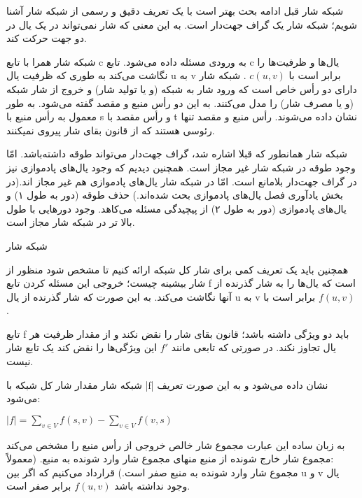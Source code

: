 
\begin{itemframe}{شبکه شار}
\itm
قبل ادامه بحث بهتر است با یک تعریف دقیق و رسمی از شبکه شار آشنا شویم؛
\itm
شبکه شار یک گراف جهت‌دار است. به این معنی که شار نمی‌تواند در یک یال در دو جهت حرکت کند.

شبکه شار همرا با تابع c به ورودی مسئله داده می‌شود. تابع c یال‌ها و ظرفیت‌‌ها را نگاشت می‌کند به طوری که ظرفیت یال u به v برابر است با
$c(u, v)$ .
\itm
شبکه شار دارای دو رأس خاص است که ورود شار به شبکه (و یا تولید شار) و خروج از شار شبکه (و یا مصرف شار) را مدل می‌کنند. به این دو رأس منبع
و مقصد
گفته می‌شود. به طور معمول به رأس منبع با s و رأس مقصد با t نشان داده می‌شوند.
\itm
رأس منبع و مقصد تنها رئوسی هستند که از قانون بقای شار پیروی نمیکنند.
\end{itemframe}


\begin{itemframe}{شبکه شار}
\itm
همانطور که قبلا اشاره شد، گراف جهت‌دار می‌تواند طوقه داشته‌باشد. امّا وجود طوقه در شبکه شار غیر مجاز است.
\itm
همچنین دیدیم که وجود یال‌های پادموازی نیز در گراف جهت‌دار بلامانع است. امّا در شبکه شار یال‌های پادموازی هم غیر مجاز اند.(در بخش يادآوری فصل یال‌های پادموازی بحث شده‌اند.)
\itm
حذف طوقه (دور به طول ۱) و یال‌های پادموازی (دور به طول ۲) از پیچیدگی مسئله می‌کاهد.
\itm
وجود دورهایی با طول بالا تر در شبکه شار مجاز است.
\end{itemframe}


\begin{itemframe}{شبکه شار}

\itm
همچنین باید یک تعریف کمی برای شار کل شبکه ارائه کنیم تا مشخص شود منظور از شار بیشینه چیست؛
\itm
خروجی این مسئله کردن تابع f است که یال‌ها را به شار گذرنده از آنها نگاشت می‌کند. به این صورت که شار گذرنده از یال u به v برابر است با
$f(u, v)$ .

\itm
تابع f باید دو ويژگی داشته باشد؛ قانون بقای شار را نقض نکند و از مقدار ظرفیت هر یال تجاوز نکند. در صورتی که تابعی مانند
$f'$
این ویژگی‌ها را نقض کند یک تابع شار نیست.

\end{itemframe}


\begin{itemframe}{شبکه شار}
\itm
مقدار شار کل شبکه با |f| نشان داده می‌شود و به این صورت تعریف می‌شود: \\
\begin{center}
$|f| = \sum_{v \in V} f(s, v) - \sum_{v \in V} f(v, s)$
\end{center}
\itm
به زبان ساده این عبارت مجموع شار خالص خروجی از رأس منبع را مشخص می‌کند :مجموع شار خارج شونده از منبع منهای مجموع شار وارد شونده به منبع. (معمولاً مجموع شار وارد شونده به منبع صفر است.)
\itm
قرارداد می‌کنیم که اگر بین u و v یال وجود نداشته باشد
$f(u, v)$
برابر صفر است.
\end{itemframe}


